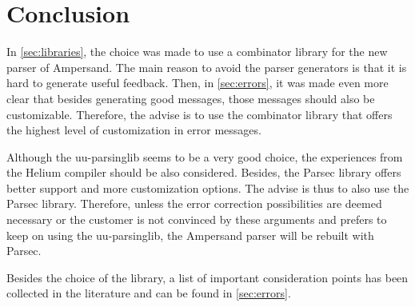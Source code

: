 
\section{Conclusion}
\label{sec:conclusion}
In \autoref{sec:libraries}, the choice was made to use a combinator library for the new parser of Ampersand.
The main reason to avoid the parser generators is that it is hard to generate useful feedback.
Then, in \autoref{sec:errors}, it was made even more clear that besides generating good messages, those messages should also be customizable.
Therefore, the advise is to use the combinator library that offers the highest level of customization in error messages.

Although the uu-parsinglib seems to be a very good choice, the experiences from the Helium compiler \cite{helium-parser} should be also considered.
Besides, the Parsec library offers better support and more customization options.
The advise is thus to also use the Parsec library.
Therefore, unless the error correction possibilities are deemed necessary or the customer is not convinced by these arguments and prefers to keep on using the uu-parsinglib, the Ampersand parser will be rebuilt with Parsec.

Besides the choice of the library, a list of important consideration points has been collected in the literature and can be found in \autoref{sec:errors}.